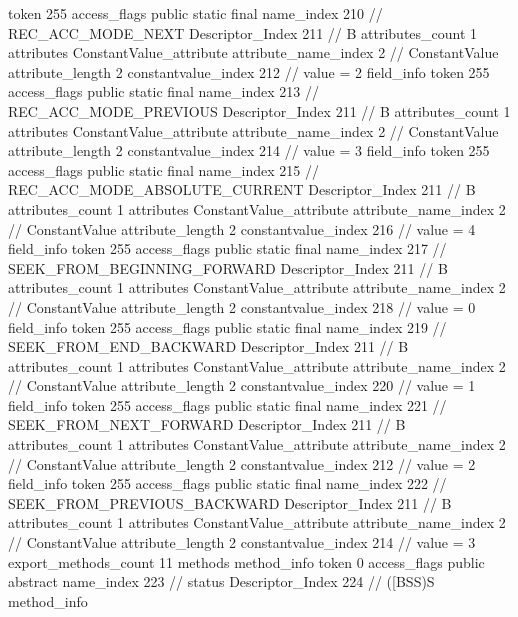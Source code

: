 {{{{{				token	255
				access_flags	public static final
				name_index	210		// REC_ACC_MODE_NEXT
				Descriptor_Index	211		// B
				attributes_count	1
				attributes {
				ConstantValue_attribute {
					attribute_name_index	2		// ConstantValue
					attribute_length	2
					constantvalue_index	212		// value = 2
				}
				}
			}
			field_info {
				token	255
				access_flags	public static final
				name_index	213		// REC_ACC_MODE_PREVIOUS
				Descriptor_Index	211		// B
				attributes_count	1
				attributes {
				ConstantValue_attribute {
					attribute_name_index	2		// ConstantValue
					attribute_length	2
					constantvalue_index	214		// value = 3
				}
				}
			}
			field_info {
				token	255
				access_flags	public static final
				name_index	215		// REC_ACC_MODE_ABSOLUTE_CURRENT
				Descriptor_Index	211		// B
				attributes_count	1
				attributes {
				ConstantValue_attribute {
					attribute_name_index	2		// ConstantValue
					attribute_length	2
					constantvalue_index	216		// value = 4
				}
				}
			}
			field_info {
				token	255
				access_flags	public static final
				name_index	217		// SEEK_FROM_BEGINNING_FORWARD
				Descriptor_Index	211		// B
				attributes_count	1
				attributes {
				ConstantValue_attribute {
					attribute_name_index	2		// ConstantValue
					attribute_length	2
					constantvalue_index	218		// value = 0
				}
				}
			}
			field_info {
				token	255
				access_flags	public static final
				name_index	219		// SEEK_FROM_END_BACKWARD
				Descriptor_Index	211		// B
				attributes_count	1
				attributes {
				ConstantValue_attribute {
					attribute_name_index	2		// ConstantValue
					attribute_length	2
					constantvalue_index	220		// value = 1
				}
				}
			}
			field_info {
				token	255
				access_flags	public static final
				name_index	221		// SEEK_FROM_NEXT_FORWARD
				Descriptor_Index	211		// B
				attributes_count	1
				attributes {
				ConstantValue_attribute {
					attribute_name_index	2		// ConstantValue
					attribute_length	2
					constantvalue_index	212		// value = 2
				}
				}
			}
			field_info {
				token	255
				access_flags	public static final
				name_index	222		// SEEK_FROM_PREVIOUS_BACKWARD
				Descriptor_Index	211		// B
				attributes_count	1
				attributes {
				ConstantValue_attribute {
					attribute_name_index	2		// ConstantValue
					attribute_length	2
					constantvalue_index	214		// value = 3
				}
				}
			}
			}
			export_methods_count	11
			methods {
				method_info {
					token	0
					access_flags	public abstract
					name_index	223		// status
					Descriptor_Index	224		// ([BSS)S
				}
				method_info {
}}}}}
